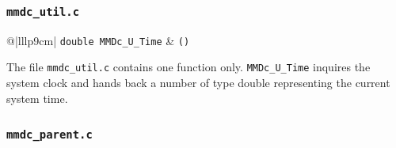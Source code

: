 \documentclass[twoside]{article}
\begin{document}
\subsubsection{\tt mmdc\_util.c}

 \begin{tabular*}{\textwidth}{@{\extracolsep\fill}|lllp{9cm}|}
\hline
{}
{\tt double MMDc\_U\_Time} &
{\tt ()}\\
\hline
\end{tabular*}
\smallskip

The file \verb|mmdc_util.c| contains one function only.
\verb|MMDc_U_Time| inquires the system clock and hands back a number of type 
double representing the current system time.

\subsubsection{{\tt mmdc\_parent.c}}
\end{document}
